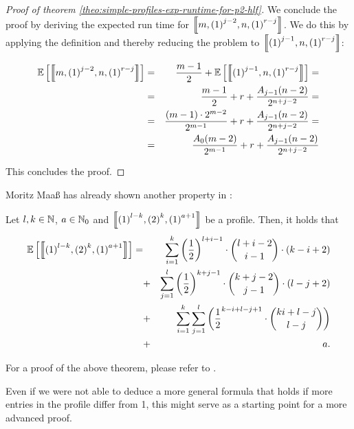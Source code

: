 \begin{proof}[Proof of theorem \ref{theo:simple-profiles-exp-runtime-for-p2-hlf}]
  We conclude the proof by deriving the expected run time for $\left\llbracket m,{(1)}^{j-2},n,{(1)}^{r-j} \right\rrbracket$. We do this by applying the definition and thereby reducing the problem to $\left\llbracket {(1)}^{j-1},n,{(1)}^{r-j} \right\rrbracket$:

  \begin{eqnarray*}
    \mathbb{E}\left[ \left\llbracket m,{(1)}^{j-2},n,{(1)}^{r-j} \right\rrbracket \right]
    & = & 
    \frac{m-1}{2} + \mathbb{E}\left[ \left\llbracket {(1)}^{j-1},n,{(1)}^{r-j} \right\rrbracket \right] = \\
    & = &
    \frac{m-1}{2} + r + \frac{A_{j-1}(n-2)}{2^{n+j-2}} = \\
    & = &
    \frac{(m-1)\cdot 2^{m-2}}{2^{m-1}} + r + \frac{A_{j-1}(n-2)}{2^{n+j-2}} = \\
    & = &
    \frac{A_0(m-2)}{2^{m-1}} + r + \frac{A_{j-1}(n-2)}{2^{n+j-2}}
  \end{eqnarray*}
  
  This concludes the proof.
\end{proof}

Moritz Maaß has already shown another property in \cite{MoritzMaasDiploma}:

\begin{theorem}
  Let $l, k\in\mathbb{N}$, $a\in\mathbb{N}_0$ and $\left\llbracket {(1)}^{l-k}, {(2)}^{k}, {(1)}^{a+1} \right\rrbracket$ be a profile. Then, it holds that
  \begin{eqnarray*}
    \mathbb{E}\left[ \left\llbracket {(1)}^{l-k}, {(2)}^{k}, {(1)}^{a+1} \right\rrbracket \right]
    = & &
    \sum_{i=1}^k \left(\frac{1}{2}\right)^{l+i-1} \cdot \binom{l+i-2}{i-1} \cdot \left( k-i+2 \right) \\
    & + & \sum_{j=1}^l \left(\frac{1}{2}\right)^{k+j-1} \cdot \binom{k+j-2}{j-1} \cdot \left( l-j+2 \right) \\
    & + & \sum_{i=1}^k \sum_{j=1}^l \left( \frac{1}{2}^{k-i+l-j+1}\cdot\binom{ki+l-j}{l-j} \right) \\
    & + & a
    .
  \end{eqnarray*}
\end{theorem}

For a proof of the above theorem, please refer to \cite{MoritzMaasDiploma}.

Even if we were not able to deduce a more general formula that holds if more entries in the profile differ from 1, this might serve as a starting point for a more advanced proof.

